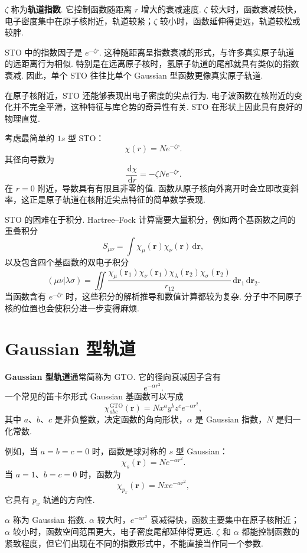 \documentclass[UTF8,11pt,a4paper,openany]{ctexbook}
\newcommand{\dd}{\,\mathrm d}\newcommand{\Ham}{\hat H}\newcommand{\tr}{\operatorname{Tr}}
\newcommand{\term}[1]{\textbf{#1}}
\begin{document}
\begin{notationbox}
$\zeta$ 称为\term{轨道指数}. 它控制函数随距离 $r$ 增大的衰减速度. $\zeta$ 较大时，函数衰减较快，电子密度集中在原子核附近，轨道较紧；$\zeta$ 较小时，函数延伸得更远，轨道较松或较胖. 
\end{notationbox}

STO 中的指数因子是 $e^{-\zeta r}$. 这种随距离呈指数衰减的形式，与许多真实原子轨道的远距离行为相似. 特别是在远离原子核时，氢原子轨道的尾部就具有类似的指数衰减. 因此，单个 STO 往往比单个 Gaussian 型函数更像真实原子轨道. 

在原子核附近，STO 还能够表现出电子密度的尖点行为. 电子波函数在核附近的变化并不完全平滑，这种特征与库仑势的奇异性有关. STO 在形状上因此具有良好的物理直觉. 

\begin{derivationbox}
考虑最简单的 $1s$ 型 STO：
\[
\chi(r)=N e^{-\zeta r}.
\]
其径向导数为
\[
\frac{\dd\chi}{\dd r}=-\zeta N e^{-\zeta r}.
\]
在 $r=0$ 附近，导数具有有限且非零的值. 函数从原子核向外离开时会立即改变斜率，这正是原子轨道在核附近尖点特征的简单数学表现. 
\end{derivationbox}

STO 的困难在于积分. Hartree--Fock 计算需要大量积分，例如两个基函数之间的重叠积分
\[
S_{\mu\nu}
=
\int \chi_\mu(\mathbf r)\chi_\nu(\mathbf r)\dd\mathbf r,
\]
以及包含四个基函数的双电子积分
\[
(\mu\nu|\lambda\sigma)
=
\iint
\frac{
\chi_\mu(\mathbf r_1)\chi_\nu(\mathbf r_1)
\chi_\lambda(\mathbf r_2)\chi_\sigma(\mathbf r_2)
}{
r_{12}
}
\dd\mathbf r_1\dd\mathbf r_2.
\]
当函数含有 $e^{-\zeta r}$ 时，这些积分的解析推导和数值计算都较为复杂. 分子中不同原子核的位置也会使积分进一步变得麻烦. 

\section{Gaussian 型轨道}

\term{Gaussian 型轨道}通常简称为 GTO. 它的径向衰减因子含有
\[
e^{-\alpha r^2}.
\]
一个常见的笛卡尔形式 Gaussian 基函数可以写成
\[
\chi^{\mathrm{GTO}}_{abc}(\mathbf r)
=
N x^a y^b z^c e^{-\alpha r^2},
\]
其中 $a$、$b$、$c$ 是非负整数，决定函数的角向形状，$\alpha$ 是 Gaussian 指数，$N$ 是归一化常数. 

例如，当 $a=b=c=0$ 时，函数是球对称的 $s$ 型 Gaussian：
\[
\chi_s(\mathbf r)=N e^{-\alpha r^2}.
\]
当 $a=1$、$b=c=0$ 时，函数为
\[
\chi_{p_x}(\mathbf r)=N x e^{-\alpha r^2},
\]
它具有 $p_x$ 轨道的方向性. 

\begin{notationbox}
$\alpha$ 称为 Gaussian 指数. $\alpha$ 较大时，$e^{-\alpha r^2}$ 衰减得快，函数主要集中在原子核附近；$\alpha$ 较小时，函数空间范围更大，电子密度尾部延伸得更远. $\zeta$ 和 $\alpha$ 都能控制函数的紧致程度，但它们出现在不同的指数形式中，不能直接当作同一个参数. 
\end{notationbox}
\end{document}
